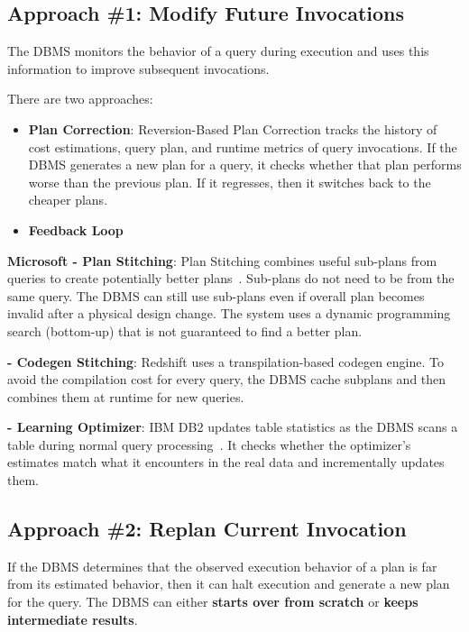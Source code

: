 \documentclass[11pt]{article}
\begin{document}
\subsection*{Approach \#1: Modify Future Invocations}
The DBMS monitors the behavior of a query during execution and uses this information to improve subsequent invocations.

There are two approaches:
\begin{itemize}
	\item \textbf{Plan Correction}: 
	Reversion-Based Plan Correction tracks the history of cost estimations, query plan, and runtime metrics of query invocations. 
	If the DBMS generates a new plan for a query, it checks whether that plan performs worse than
	the previous plan. 
	If it regresses, then it switches back to the cheaper plans.
	
	\item \textbf{Feedback Loop}
\end{itemize}

\textbf{Microsoft - Plan Stitching}:
Plan Stitching combines useful sub-plans from queries to create potentially better plans~\cite{Ding2018}. Sub-plans do not need to be from the same query. The DBMS can still use sub-plans even if overall plan becomes invalid after a physical design change. The system uses a dynamic programming search (bottom-up) that is not guaranteed to find a better plan.

\textbf{ - Codegen Stitching}:
Redshift uses a transpilation-based codegen engine. To avoid the compilation cost for every query, the DBMS cache subplans and then combines them at runtime for new queries.

\textbf{ - Learning Optimizer}:
IBM DB2 updates table statistics as the DBMS scans a table during normal query processing~\cite{Stillger2001}. It checks whether the optimizer’s estimates match what it encounters in the real data and incrementally updates them.
\subsection*{Approach \#2: Replan Current Invocation}
If the DBMS determines that the observed execution behavior of a plan is far from its estimated behavior, then it can halt execution and generate a new plan for the query.
The DBMS can either \textbf{starts over from scratch} or \textbf{keeps intermediate results}.
\end{document}
